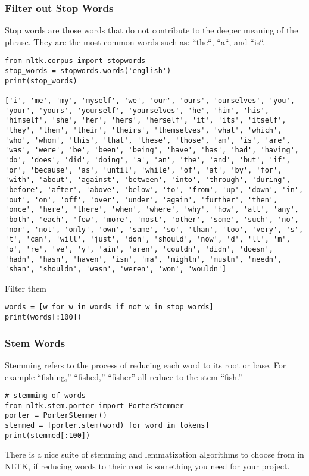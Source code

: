 \begin{frame}[fragile]
\frametitle{Filter out Stop Words}
Stop words are those words that do not contribute to the deeper meaning of the phrase.
They are the most common words such as: “the“, “a“, and “is“.
\begin{lstlisting}
from nltk.corpus import stopwords
stop_words = stopwords.words('english')
print(stop_words)

['i', 'me', 'my', 'myself', 'we', 'our', 'ours', 'ourselves', 'you', 'your', 'yours', 'yourself', 'yourselves', 'he', 'him', 'his', 'himself', 'she', 'her', 'hers', 'herself', 'it', 'its', 'itself', 'they', 'them', 'their', 'theirs', 'themselves', 'what', 'which', 'who', 'whom', 'this', 'that', 'these', 'those', 'am', 'is', 'are', 'was', 'were', 'be', 'been', 'being', 'have', 'has', 'had', 'having', 'do', 'does', 'did', 'doing', 'a', 'an', 'the', 'and', 'but', 'if', 'or', 'because', 'as', 'until', 'while', 'of', 'at', 'by', 'for', 'with', 'about', 'against', 'between', 'into', 'through', 'during', 'before', 'after', 'above', 'below', 'to', 'from', 'up', 'down', 'in', 'out', 'on', 'off', 'over', 'under', 'again', 'further', 'then', 'once', 'here', 'there', 'when', 'where', 'why', 'how', 'all', 'any', 'both', 'each', 'few', 'more', 'most', 'other', 'some', 'such', 'no', 'nor', 'not', 'only', 'own', 'same', 'so', 'than', 'too', 'very', 's', 't', 'can', 'will', 'just', 'don', 'should', 'now', 'd', 'll', 'm', 'o', 're', 've', 'y', 'ain', 'aren', 'couldn', 'didn', 'doesn', 'hadn', 'hasn', 'haven', 'isn', 'ma', 'mightn', 'mustn', 'needn', 'shan', 'shouldn', 'wasn', 'weren', 'won', 'wouldn']
\end{lstlisting}
Filter them
\begin{lstlisting}
words = [w for w in words if not w in stop_words]
print(words[:100])
\end{lstlisting}
\end{frame}

\begin{frame}[fragile]
\frametitle{Stem Words}
Stemming refers to the process of reducing each word to its root or base.
For example “fishing,” “fished,” “fisher” all reduce to the stem “fish.”
\begin{lstlisting}
# stemming of words
from nltk.stem.porter import PorterStemmer
porter = PorterStemmer()
stemmed = [porter.stem(word) for word in tokens]
print(stemmed[:100])
\end{lstlisting}
There is a nice suite of stemming and lemmatization algorithms to choose from in NLTK, if reducing words to their root is something you need for your project.
\end{frame}


